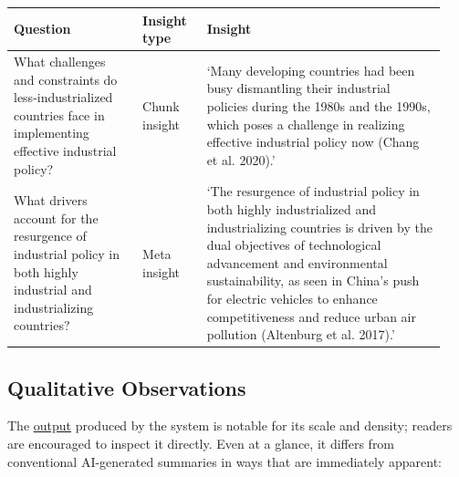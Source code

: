 \documentclass[
  11pt,
]{article}
\newcounter{none} %
\begin{document}
{\def\LTcaptype{none}
\begin{longtable}[]{@{}
  >{\raggedright\arraybackslash}p{0.28\linewidth}
  >{\raggedright\arraybackslash}p{0.14\linewidth}
  >{\raggedright\arraybackslash}p{0.52\linewidth}@{}}
\toprule\noalign{}
\begin{minipage}[b]{\linewidth}\raggedright
Question
\end{minipage} & \begin{minipage}[b]{\linewidth}\raggedright
Insight type
\end{minipage} & \begin{minipage}[b]{\linewidth}\raggedright
Insight
\end{minipage} \\
\midrule\noalign{}
\endhead
\bottomrule\noalign{}
\endlastfoot
What challenges and constraints do less-industrialized countries face in
implementing effective industrial policy? & Chunk insight & `Many
developing countries had been busy dismantling their industrial policies
during the 1980s and the 1990s, which poses a challenge in realizing
effective industrial policy now (Chang et al. 2020).' \\
What drivers account for the resurgence of industrial policy in both
highly industrial and industrializing countries? & Meta insight & `The
resurgence of industrial policy in both highly industrialized and
industrializing countries is driven by the dual objectives of
technological advancement and environmental sustainability, as seen in
China's push for electric vehicles to enhance competitiveness and reduce
urban air pollution (Altenburg et al. 2017).' \\
\end{longtable}
}

\subsection{Qualitative
Observations}\label{qualitative-observations}

The
\href{https://github.com/morrisseyj/ReadingMachine/blob/main/evaluation/industrial_policy_main_run/industrial_policy_current.md}{output}
produced by the system is notable for its scale and density; readers are 
encouraged to inspect it directly. Even at a glance, it differs from 
conventional AI-generated summaries in ways that are immediately apparent:
\end{document}
